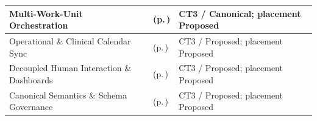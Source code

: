 \begin{longtable}{|>{\raggedright\arraybackslash}p{0.37\TableWidth}|>{\raggedright\arraybackslash}p{0.4\TableWidth}|>{\raggedright\arraybackslash}p{0.23\TableWidth}|}
Multi-Work-Unit Orchestration & \nameref{cap:bec-workflow-activity-coordination} (p.\,\pageref{cap:bec-workflow-activity-coordination}) & CT3 / Canonical; placement Proposed\\\hline
Operational \& Clinical Calendar Sync & \nameref{cap:bec-reviewed-operational-clinical-calendar-coordination} (p.\,\pageref{cap:bec-reviewed-operational-clinical-calendar-coordination}) & CT3 / Proposed; placement Proposed\\\hline
Decoupled Human Interaction \& Dashboards & \nameref{cap:bec-reviewed-contextual-information-presentation} (p.\,\pageref{cap:bec-reviewed-contextual-information-presentation}) & CT3 / Proposed; placement Proposed\\\hline
Canonical Semantics \& Schema Governance & \nameref{cap:bec-reviewed-enterprise-canonical-reusable-model-design} (p.\,\pageref{cap:bec-reviewed-enterprise-canonical-reusable-model-design}) & CT3 / Proposed; placement Proposed\\\hline
\end{longtable}\endgroup
